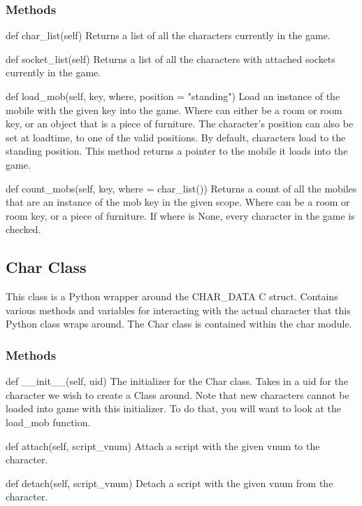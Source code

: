 \documentclass[12pt]{article}
\begin{document}
\subsubsection{Methods}
def char\_list(self) \newline
Returns a list of all the characters currently in the game.

def socket\_list(self) \newline
Returns a list of all the characters with attached sockets currently in the game.

def load\_mob(self, key, where, position = "standing") \newline
Load an instance of the mobile with the given key into the game. Where can either be a room or room key, or an object that is a piece of furniture. The character's position can also be set at loadtime, to one of the valid positions. By default, characters load to the standing position. This method returns a pointer to the mobile it loads into the game.

def count\_mobs(self, key, where = char\_list()) \newline
Returns a count of all the mobiles that are an instance of the mob key in the given scope. Where can be a room or room key, or a piece of furniture. If where is None, every character in the game is checked.


\subsection{Char Class}
This class is a Python wrapper around the CHAR\_DATA C struct. Contains various methods and variables for interacting with the actual character that this Python class wraps around. The Char class is contained within the char module.

\subsubsection{Methods}
def \_\_init\_\_(self, uid) \newline
The initializer for the Char class. Takes in a uid for the character we wish to create a Class around. Note that new characters cannot be loaded into game with this initializer. To do that, you will want to look at the load\_mob function.

def attach(self, script\_vnum) \newline
Attach a script with the given vnum to the character.

def detach(self, script\_vnum) \newline
Detach a script with the given vnum from the character.
\end{document}
